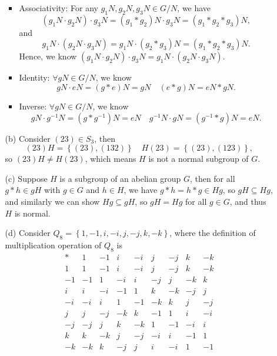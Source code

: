 \documentclass[12pt]{article}
\begin{document}
\begin{enumerate}
\begin{itemize}
\begin{itemize}
            \item Associativity: For any \(g_1 N, g_2 N, g_3 N \in G/N\), we have 
            \[
                (g_1 N \cdot g_2 N) \cdot g_3 N = (g_1 * g_2)N \cdot g_3 N = (g_1 * g_2 * g_3)N,
            \] and 
            \[
                g_1 N \cdot (g_2 N \cdot g_3 N) = g_1 N \cdot (g_2 * g_3)N = (g_1 * g_2 * g_3)N.
            \]
            Hence, we know \((g_1 N \cdot g_2 N) \cdot g_3 N = g_1 N \cdot (g_2 N \cdot g_3 N)\). 
            \item Identity: \(\forall g N \in G/N\), we know 
            \[
                gN \cdot eN = (g * e)N = gN \quad (e * g)N = eN * gN.
            \]
            \item Inverse: \(\forall gN \in G/N\), we know
            \[
                gN \cdot g^{-1} N = (g * g^{-1}) N = eN \quad g^{-1}N \cdot gN = (g^{-1} * g)N = eN.
            \] 
        \end{itemize}
        \item [(b)] Consider \((23) \in S_3\), then 
        \[
            (23)H = \left\{ (23), (132) \right\} \quad H(23)=\left\{ (23), (123) \right\}, 
        \] so \((23)H \neq H(23)\), which means \(H\) is not a normal subgroup of \(G\).   
        \item [(c)] Suppose \(H\) is a subgroup of an abelian group \(G\), then for all \(g * h \in gH\) with \(g \in G\) and \(h \in H\), we have \(g * h = h * g \in Hg\), so \(gH \subseteq Hg\), and similarly we can show \(Hg \subseteq gH\), so \(gH = Hg\) for all \(g \in G\), and thus \(H\) is normal.        
        \item [(d)] Consider \(Q_8 = \left\{ 1, -1, i, -i, j, -j, k, -k \right\} \), where the definition of multiplication operation of \(Q_8\) is 
        \[
            \begin{array}{c|cccccccc}
            * & 1 & -1 & i & -i & j & -j & k & -k \\
            \hline
            1 & 1 & -1 & i & -i & j & -j & k & -k \\
            -1 & -1 & 1 & -i & i & -j & j & -k & k \\
            i & i & -i & -1 & 1 & k & -k & -j & j \\
            -i & -i & i & 1 & -1 & -k & k & j & -j \\
            j & j & -j & -k & k & -1 & 1 & i & -i \\
            -j & -j & j & k & -k & 1 & -1 & -i & i \\
            k & k & -k & j & -j & -i & i & -1 & 1 \\
            -k & -k & k & -j & j & i & -i & 1 & -1
            \end{array}
        \]

    \end{itemize}
\end{enumerate}
\end{document}
